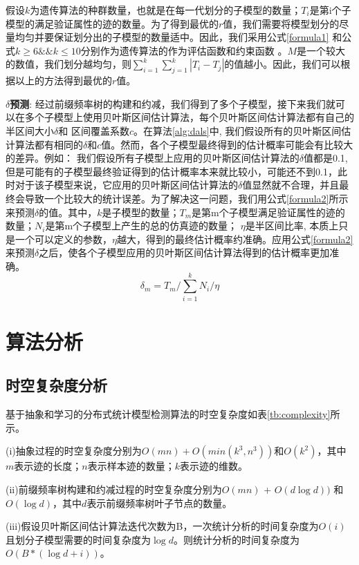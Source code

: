 假设$k$为遗传算法的种群数量，也就是在每一代划分的子模型的数量；$T_i$是第i个子模型的满足验证属性的迹的数量。为了得到最优的$r$值，我们需要将模型划分的尽量均匀并要保证划分出的子模型的数量适中。因此，我们采用公式\ref{formula1} 和公式$k \geq 6 \&\& k \leq 10$分别作为遗传算法的作为评估函数和约束函数 。$M$是一个较大的数值，我们划分越均匀，则$\sum\limits_{i=1}^k \sum\limits_{j=1}^k |T_i - T_j|$的值越小。因此，我们可以根据以上的方法得到最优的$r$值。

\textbf{$\delta$预测}:
经过前缀频率树的构建和约减，我们得到了多个子模型，接下来我们就可以在多个子模型上使用贝叶斯区间估计算法，每个贝叶斯区间估计算法都有自己的半区间大小$\delta$和 区间覆盖系数$c$。在算法\ref{alg:dals}中, 我们假设所有的贝叶斯区间估计算法都有相同的$\delta$和$c$值。然而，各个子模型最终得到的估计概率可能会有比较大的差异。例如： 我们假设所有子模型上应用的贝叶斯区间估计算法的$\delta$值都是0.1, 但是可能有的子模型最终验证得到的估计概率本来就比较小，可能还不到0.1，此时对于该子模型来说，它应用的贝叶斯区间估计算法的$\delta$值显然就不合理，并且最终会导致一个比较大的统计误差。为了解决这一问题，我们用公式\ref{formula2}所示来预测$\delta$的值。其中，$k$是子模型的数量；$T_m$是第m个子模型满足验证属性的迹的数量；$N_i$是第m个子模型上产生的总的仿真迹的数量； $\eta$是半区间比率, 本质上只是一个可以定义的参数，$\eta$越大，得到的最终估计概率约准确。应用公式\ref{formula2}来预测$\delta$之后，使各个子模型应用的贝叶斯区间估计算法得到的估计概率更加准确。
\begin{equation}
\label{formula2}
\delta_m = T_m / \sum\limits_{i=1}^k N_i / \eta
\end{equation}
\section{算法分析}
\subsection{时空复杂度分析}
基于抽象和学习的分布式统计模型检测算法的时空复杂度如表\ref{tb:complexity}所示。

(i)抽象过程的时空复杂度分别为$O(mn)+O(min(k^3,n^3))$和$O(k^2)$，其中 $m$表示迹的长度；$n$表示样本迹的数量；$k$表示迹的维数。 

(ii)前缀频率树构建和约减过程的时空复杂度分别为$O(mn)$ + $O(d\log{d}))$ 和$O(\log{d})$，其中$d$表示前缀频率树叶子节点的数量。

(iii)假设贝叶斯区间估计算法迭代次数为B，一次统计分析的时间复杂度为$O(i)$且划分子模型需要的时间复杂度为$\log{d}$。则统计分析的时间复杂度为 $O(B*(\log{d}+i))$。


